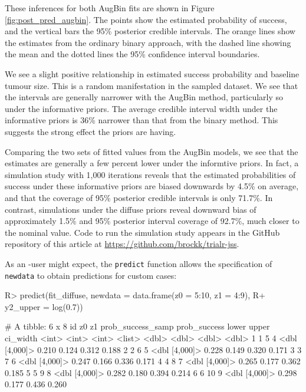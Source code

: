 \documentclass[article]{jss}
\begin{document}
These inferences for both AugBin fits are shown in Figure
\ref{fig:post_pred_augbin}. The points show the estimated probability of
success, and the vertical bars the 95\% posterior credible intervals.
The orange lines show the estimates from the ordinary binary approach,
with the dashed line showing the mean and the dotted lines the 95\%
confidence interval boundaries.

We see a slight positive relationship in estimated success probability
and baseline tumour size. This is a random manifestation in the sampled
dataset. We see that the intervals are generally narrower with the
AugBin method, particularly so under the informative priors. The average
credible interval width under the informative priors is 36\% narrower
than that from the binary method. This suggests the strong effect the
priors are having.

Comparing the two sets of fitted values from the AugBin models, we see
that the estimates are generally a few percent lower under the
informtive priors. In fact, a simulation study with 1,000 iterations
reveals that the estimated probabilities of success under these
informative priors are biased downwards by 4.5\% on average, and that
the coverage of 95\% posterior credible intervals is only 71.7\%. In
contrast, simulations under the diffuse priors reveal downward bias of
approximately 1.5\% and 95\% posterior interval coverage of 92.7\%, much
closer to the nominal value. Code to run the simulation study appears in
the GitHub repository of this article at
\url{https://github.com/brockk/trialr-jss}.

As an -user might expect, the \texttt{predict} function
allows the specification of \texttt{newdata} to obtain predictions for
custom cases:

\begin{CodeChunk}

\begin{CodeInput}
R> predict(fit_diffuse, newdata = data.frame(z0 = 5:10, z1 = 4:9), 
R+         y2_upper = log(0.7))
\end{CodeInput}

\begin{CodeOutput}
# A tibble: 6 x 8
     id    z0    z1 prob_success_samp prob_success lower upper ci_width
  <int> <int> <int> <list>                   <dbl> <dbl> <dbl>    <dbl>
1     1     5     4 <dbl [4,000]>            0.210 0.124 0.312    0.188
2     2     6     5 <dbl [4,000]>            0.228 0.149 0.320    0.171
3     3     7     6 <dbl [4,000]>            0.247 0.166 0.336    0.171
4     4     8     7 <dbl [4,000]>            0.265 0.177 0.362    0.185
5     5     9     8 <dbl [4,000]>            0.282 0.180 0.394    0.214
6     6    10     9 <dbl [4,000]>            0.298 0.177 0.436    0.260
\end{CodeOutput}
\end{CodeChunk}
\end{document}
